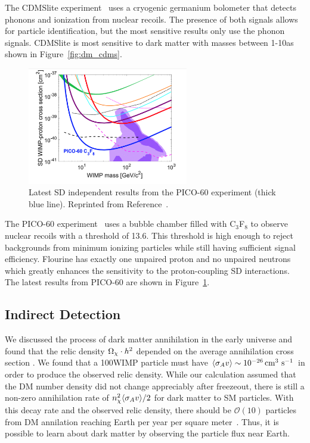 The CDMSlite experiment~\cite{CDMS2016} uses a cryogenic germanium bolometer that detects phonons and ionization from nuclear recoils.
The presence of both signals allows for particle identification, but the most sensitive results only use the phonon signals.
CDMSlite is most sensitive to dark matter with masses between 1-10\GeV as shown in Figure~\ref{fig:dm_cdms}.

\begin{figure}[htbp]
  \centering
  \includegraphics[width=0.625\textwidth]{DarkMatter/Figures/pico.png}
  \caption{
    Latest SD independent results from the PICO-60 experiment (thick blue line).
    Reprinted from Reference~\cite{PICO2017}.
  }
  \label{fig:dm_pico}
\end{figure}

The PICO-60 experiment~\cite{PICO2017} uses a bubble chamber filled with C$_3$F$_8$ to observe nuclear recoils with a threshold of 13.6\keV.
This threshold is high enough to reject backgrounds from minimum ionizing particles while still having sufficient signal efficiency.
Flourine has exactly one unpaired proton and no unpaired neutrons which greatly enhances the sensitivity to the proton-coupling SD interactions.
The latest results from PICO-60 are shown in Figure~\ref{fig:dm_pico}. 

\subsection{Indirect Detection}
\label{sec:dm_indirect}

We discussed the process of dark matter annihilation in the early universe and found that the relic density $\Omega_\chi \cdot h^2$ depended on the average annihilation cross section \sigmav.
We found that a 100\GeV WIMP particle must have $\langle \sigma_A v \rangle \sim 10^{-26} \,\text{cm}^{3}\text{ s}^{-1}$ in order to produce the observed relic density.
While our calculation assumed that the DM number density did not change appreciably after freezeout, there is still a non-zero annihilation rate of $n_\chi^2 \langle \sigma_A v \rangle / 2$ for dark matter to SM particles.
With this decay rate and the observed relic density, there should be $\mathcal{O}(10)$ particles from DM annilation reaching Earth per year per square meter~\cite{Slatyer2017}.
Thus, it is possible to learn about dark matter by observing the particle flux near Earth.

